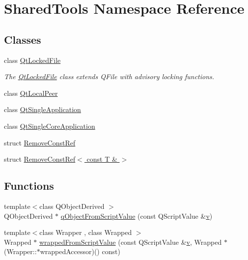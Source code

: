 \hypertarget{namespace_shared_tools}{\section{Shared\-Tools Namespace Reference}
\label{namespace_shared_tools}
}
\subsection*{Classes}
\begin{DoxyCompactItemize}
\item 
class \hyperlink{class_shared_tools_1_1_qt_locked_file}{Qt\-Locked\-File}
\begin{DoxyCompactList}\small\item\em The \hyperlink{class_shared_tools_1_1_qt_locked_file}{Qt\-Locked\-File} class extends Q\-File with advisory locking functions. \end{DoxyCompactList}\item 
class \hyperlink{class_shared_tools_1_1_qt_local_peer}{Qt\-Local\-Peer}
\item 
class \hyperlink{class_shared_tools_1_1_qt_single_application}{Qt\-Single\-Application}
\item 
class \hyperlink{class_shared_tools_1_1_qt_single_core_application}{Qt\-Single\-Core\-Application}
\item 
struct \hyperlink{struct_shared_tools_1_1_remove_const_ref}{Remove\-Const\-Ref}
\item 
struct \hyperlink{struct_shared_tools_1_1_remove_const_ref_3_01const_01_t_01_6_01_4}{Remove\-Const\-Ref$<$ const T \& $>$}
\end{DoxyCompactItemize}
\subsection*{Functions}
\begin{DoxyCompactItemize}
\item 
{\footnotesize template$<$class Q\-Object\-Derived $>$ }\\Q\-Object\-Derived $\ast$ \hyperlink{namespace_shared_tools_a09adf0e67cdbd2a754d3a643f5005876}{q\-Object\-From\-Script\-Value} (const Q\-Script\-Value \&\hyperlink{glext_8h_a14cfbe2fc2234f5504618905b69d1e06}{v})
\item 
{\footnotesize template$<$class Wrapper , class Wrapped $>$ }\\Wrapped $\ast$ \hyperlink{namespace_shared_tools_a876960ee66feac4ce39006aa1894d274}{wrapped\-From\-Script\-Value} (const Q\-Script\-Value \&\hyperlink{glext_8h_a14cfbe2fc2234f5504618905b69d1e06}{v}, Wrapped $\ast$(Wrapper\-::$\ast$wrapped\-Accessor)() const)
\end{DoxyCompactItemize}


